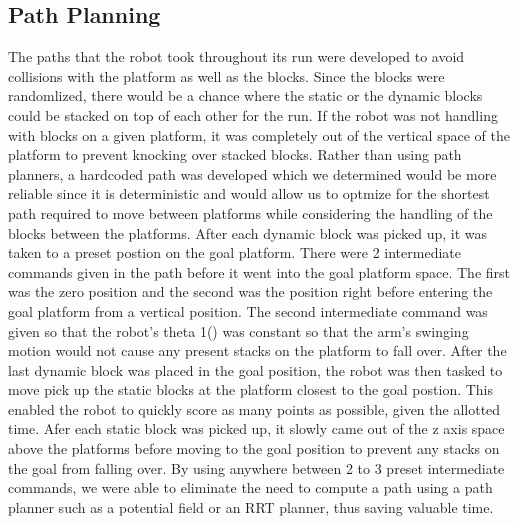 \documentclass{article}
\begin{document}
    \subsection{Path Planning}
   The paths that the robot took throughout its run were developed to avoid collisions with the platform as well as the blocks. Since the blocks were randomlized, there would be a chance where the static or the dynamic blocks could be stacked on top of each other for the run. If the robot was not handling with blocks on a given platform, it was completely out of the vertical space of the platform to prevent knocking over stacked blocks. Rather than using path planners, a hardcoded path was developed which we determined would be more reliable since it is deterministic and would allow us to optmize for the shortest path required to move between platforms while considering the handling of the blocks between the platforms. After each dynamic block was picked up, it was taken to a preset postion on the goal platform. There were 2 intermediate commands given in the path before it went into the goal platform space. The first was the zero position and the second was the position right before entering the goal platform from a vertical position. The second intermediate command was given so that the robot's theta 1() was constant so that the arm's swinging motion would not cause any present stacks on the platform to fall over. After the last dynamic block was placed in the goal position, the robot was then tasked to move pick up the static blocks at the platform closest to the goal postion. This enabled the robot to quickly score as many points as possible, given the allotted time. Afer each static block was picked up, it slowly came out of the z axis space above the platforms before moving to the goal position to prevent any stacks on the goal from falling over. By using anywhere between 2 to 3 preset intermediate commands, we were able to eliminate the need to compute a path using a path planner such as a potential field or an RRT planner, thus saving valuable time. 
 
   

    
\end{document}
